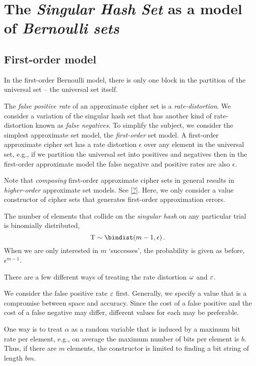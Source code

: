\documentclass[ ../main.tex]{subfiles}
\begin{document}
\section{The \emph{Singular Hash Set} as a model of \emph{Bernoulli sets}}
\label{sec:shs}

\subsection{First-order model}
\label{sec:foshs}
In the first-order Bernoulli model, there is only one block in the partition of the universal set -- the universal set itself.

The \emph{false positive rate} of an approximate cipher set is a \emph{rate-distortion}.
We consider a variation of the singular hash set that has another kind of rate-distortion known as \emph{false negatives}.
To simplify the subject, we consider the simplest approximate set model, the \emph{first-order} set model.
A first-order approximate cipher set has a rate distortion $\epsilon$ over any element in the universal set, e.g., if we partition the universal set into positives and negatives then in the first-order approximate model the false negative and positive rates are also $\epsilon$.

Note that \emph{composing} first-order approximate cipher sets in general results in \emph{higher-order} approximate set models.
See \cref{?}.
Here, we only consider a value constructor of cipher sets that generates first-order approximation errors.

The number of elements that collide on the \emph{singular hash} on any particular trial is binomially distributed,
\begin{equation}
    \RV{T} \sim \bindist(m-1,\epsilon)\,.
\end{equation}
When we are only interested in $m$ `successes', the probability is given as before, $\epsilon^{m-1}$.

There are a few different ways of treating the rate distortion $\omega$ and $\varepsilon$.

We consider the false positive rate $\varepsilon$ first.
Generally, we specify a value that is a compromise between space and accuracy.
Since the cost of a false positive and the cost of a false negative may differ, different values for each may be preferable.

One way is to treat $\alpha$ as a random variable that is induced by a maximum bit rate per element, e.g., on average the maximum number of bits per element is $b$.
Thus, if there are $m$ elements, the constructor is limited to finding a bit string of length $b m$.
\end{document}
